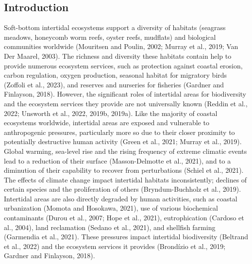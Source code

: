 \documentclass[
  letterpaper,
  11pt,
  english,
  singlespacing,
  headsepline]{MastersDoctoralThesis}
\newcommand{\startonrightwithgap}{%
  \clearpage
  \ifodd\value{page}
    \thispagestyle{empty}\mbox{}\clearpage
    \thispagestyle{empty}\mbox{}\clearpage
  \else
    \thispagestyle{empty}\mbox{}\clearpage
  \fi
}
\begin{document}
\begin{spacing}{1.5}
\startonrightwithgap

\section{Introduction}\label{introduction-1}

Soft-bottom intertidal ecosystems support a diversity of habitats
(seagrass meadows, honeycomb worm reefs, oyster reefs, mudflats) and
biological communities worldwide (Mouritsen and Poulin, 2002; Murray et
al., 2019; Van Der Maarel, 2003). The richness and diversity these
habitats contain help to provide numerous ecosystem services, such as
protection against coastal erosion, carbon regulation, oxygen
production, seasonal habitat for migratory birds (Zoffoli et al., 2023),
and reserves and nurseries for fisheries (Gardner and Finlayson, 2018).
However, the significant roles of intertidal areas for biodiversity and
the ecosystem services they provide are not universally known (Reddin et
al., 2022; Unsworth et al., 2022, 2019b, 2019a). Like the majority of
coastal ecosystems worldwide, intertidal areas are exposed and
vulnerable to anthropogenic pressures, particularly more so due to their
closer proximity to potentially destructive human activity (Green et
al., 2021; Murray et al., 2019). Global warming, sea-level rise and the
rising frequency of extreme climatic events lead to a reduction of their
surface (Masson-Delmotte et al., 2021), and to a diminution of their
capability to recover from perturbations (Schiel et al., 2021). The
effects of climate change impact intertidal habitats inconsistently;
declines of certain species and the proliferation of others
(Bryndum-Buchholz et al., 2019). Intertidal areas are also directly
degraded by human activities, such as coastal urbanization (Momota and
Hosokawa, 2021), use of various biochemical contaminants (Durou et al.,
2007; Hope et al., 2021), eutrophication (Cardoso et al., 2004), land
reclamation (Sedano et al., 2021), and shellfish farming (Garmendia et
al., 2021). These pressures impact intertidal biodiversity (Beltrand et
al., 2022) and the ecosystem services it provides (Brondízio et al.,
2019; Gardner and Finlayson, 2018).


\end{spacing}
\end{document}
